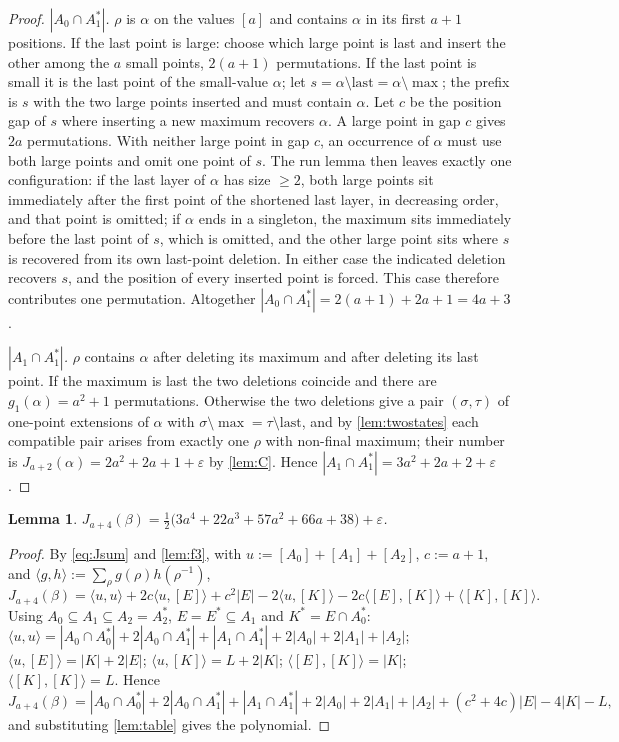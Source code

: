 \documentclass[11pt,reqno]{amsart}
\theoremstyle{plain}
\newtheorem{lemma}[lemma]{Lemma}
\theoremstyle{definition}
\theoremstyle{remark}
\newcommand{\bb}[1]{\left[#1\right]}
\begin{document}
\begin{proof}
\emph{$|A_0\cap A_1^*|$.}  $\rho$ is $\alpha$ on the values $[a]$ and contains $\alpha$ in its first $a+1$ positions. If the last point is large: choose which large point is last and insert the other among the $a$ small points, $2(a+1)$ permutations. If the last point is small it is the last point of the small-value $\alpha$; let $s=\alpha\setminus\!\mathrm{last}=\alpha\setminus\!\max$; the prefix is $s$ with the two large points inserted and must contain $\alpha$. Let $c$ be the position gap of $s$ where inserting a new maximum recovers $\alpha$. A large point in gap $c$ gives $2a$ permutations. With neither large point in gap $c$, an occurrence of $\alpha$ must use both large points and omit one point of $s$. The run lemma then leaves exactly one configuration: if the last layer of $\alpha$ has size $\ge2$, both large points sit immediately after the first point of the shortened last layer, in decreasing order, and that point is omitted; if $\alpha$ ends in a singleton, the maximum sits immediately before the last point of $s$, which is omitted, and the other large point sits where $s$ is recovered from its own last-point deletion. In either case the indicated deletion recovers $s$, and the position of every inserted point is forced. This case therefore contributes one permutation. Altogether $|A_0\cap A_1^*|=2(a+1)+2a+1=4a+3$.

\emph{$|A_1\cap A_1^*|$.}  $\rho$ contains $\alpha$ after deleting its maximum and after deleting its last point. If the maximum is last the two deletions coincide and there are $g_1(\alpha)=a^2+1$ permutations. Otherwise the two deletions give a pair $(\sigma,\tau)$ of one-point extensions of $\alpha$ with $\sigma\setminus\!\max=\tau\setminus\!\mathrm{last}$, and by \cref{lem:twostates} each compatible pair arises from exactly one $\rho$ with non-final maximum; their number is $J_{a+2}(\alpha)=2a^2+2a+1+\varepsilon$ by \cref{lem:C}. Hence $|A_1\cap A_1^*|=3a^2+2a+2+\varepsilon$.
\end{proof}

\begin{lemma}\label{lem:J4}
$J_{a+4}(\beta)=\tfrac12\bigl(3a^4+22a^3+57a^2+66a+38\bigr)+\varepsilon$.
\end{lemma}

\begin{proof}
By \eqref{eq:Jsum} and \cref{lem:f3}, with $u:=\bb{A_0}+\bb{A_1}+\bb{A_2}$, $c:=a+1$, and $\langle g,h\rangle:=\sum_\rho g(\rho)h(\rho^{-1})$,
\[
J_{a+4}(\beta)=\langle u,u\rangle+2c\langle u,\bb E\rangle+c^2|E|-2\langle u,\bb K\rangle-2c\langle\bb E,\bb K\rangle+\langle\bb K,\bb K\rangle .
\]
Using $A_0\subseteq A_1\subseteq A_2=A_2^*$, $E=E^*\subseteq A_1$ and $K^*=E\cap A_0^*$: $\langle u,u\rangle=|A_0\cap A_0^*|+2|A_0\cap A_1^*|+|A_1\cap A_1^*|+2|A_0|+2|A_1|+|A_2|$; $\langle u,\bb E\rangle=|K|+2|E|$; $\langle u,\bb K\rangle=L+2|K|$; $\langle\bb E,\bb K\rangle=|K|$; $\langle\bb K,\bb K\rangle=L$. Hence
\[
J_{a+4}(\beta)=|A_0\cap A_0^*|+2|A_0\cap A_1^*|+|A_1\cap A_1^*|+2|A_0|+2|A_1|+|A_2|+(c^2+4c)|E|-4|K|-L,
\]
and substituting \cref{lem:table} gives the polynomial.
\end{proof}
\end{document}
